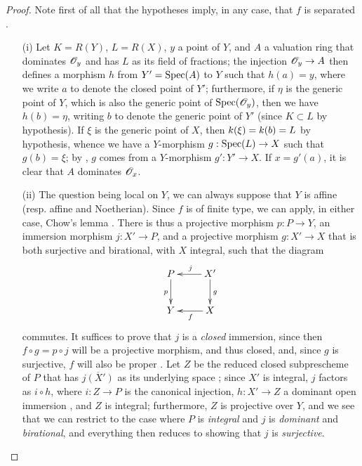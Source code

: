 \begin{proof}
Note first of all that the hypotheses imply, in any case, that $f$ is separated .
\begin{enumerate}
    \item[\rm{(i)}] Let $K=R(Y)$, $L=R(X)$, $y$ a point of $Y$, and $A$ a valuation ring that dominates $\mathscr{O}_y$ and has $L$ as its field of fractions;
        the injection $\sh{O}_y\to A$ then defines a morphism $h$ from $Y'=\operatorname{Spec}(A)$ to $Y$  such that $h(a)=y$, where we write $a$ to denote the closed point of $Y'$;
        furthermore, if $\eta$ is the generic point of $Y$, which is also the generic point of $\operatorname{Spec}(\mathscr{O}_y)$, then we have $h(b)=\eta$, writing $b$ to denote the generic point of $Y'$ (since $K\subset L$ by hypothesis).
        If $\xi$ is the generic point of $X$, then $k(\xi)=k(b)=L$ by hypothesis, whence we have a $Y$-morphism $g:\Spec(L)\to X$ such that $g(b)=\xi$;
        by , $g$ comes from a $Y$-morphism $g':Y'\to X$.
        If $x=g'(a)$, it is clear that $A$ dominates $\mathscr{O}_x$.
    \item[\rm{(ii)}] The question being local on $Y$, we can always suppose that $Y$ is affine (resp. affine and Noetherian).
        Since $f$ is of finite type, we can apply, in either case, Chow's lemma .
        There is thus a projective morphism $p:P\to Y$, an immersion morphism $j:X'\to P$, and a projective morphism $g:X'\to X$ that is both surjective and birational, with $X$ integral, such that the diagram
        \[
            \xymatrix{
                P \ar[d]_p
                & X' \ar[l]_j \ar[d]^g
            \\  Y
                & X \ar[l]^f
            }
        \]
        commutes.
        It suffices to prove that $j$ is a \emph{closed} immersion, since then $f\circ g=p\circ j$ will be a projective morphism, and thus closed, and, since $g$ is surjective, $f$ will also be proper .
        Let $Z$ be the reduced closed subprescheme of $P$ that has $\overline{j(X')}$ as its underlying space ;
        since $X'$ is integral, $j$ factors as $i\circ h$, where $i:Z\to P$ is the canonical injection, $h:X'\to Z$ a dominant open immersion , and $Z$ is integral;
        furthermore, $Z$ is projective over $Y$, and we see that we can restrict to the case where $P$ is \emph{integral} and $j$ is \emph{dominant} and \emph{birational}, and everything then reduces to showing that $j$ is \emph{surjective}.

\end{enumerate}
\end{proof}
